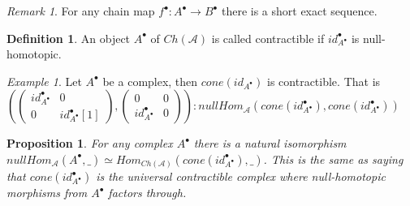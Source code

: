 \documentclass[11pt]{article}
\newtheorem{prop}[theorem]{Proposition}
\theoremstyle{definition}
\newtheorem{definition}{Definition}[section]
\theoremstyle{remark}
\newtheorem*{remark}{Remark}
\newtheorem*{example}{Example}
\newcommand{\chain}[1]{#1^{\bullet}}
\begin{document}
            \begin{remark}
                For any chain map $\chain{f}:\chain{A}\rightarrow\chain{B}$ there is a short exact sequence.
                \begin{center}
                \end{center}
            \end{remark}

            \begin{definition}
                An object $\chain{A}$ of $Ch(\mathcal{A})$ is called contractible if $\chain{id_{\chain{A}}}$ is null-homotopic.
            \end{definition}

            \begin{example}
                Let $\chain{A}$ be a complex, then $cone(id_{\chain{A}})$ is contractible. That is \\$(\begin{pmatrix} \chain{id_{\chain{A}}} & 0 \\ 0 & \chain{id_{\chain{A}}}[1]\end{pmatrix},\begin{pmatrix} 0 & 0 \\ \chain{id_{\chain{A}}} & 0 \end{pmatrix}):nullHom_{\mathcal{A}}(cone(\chain{id_{\chain{A}}}), cone(\chain{id_{\chain{A}}}))$
            \end{example}

            \begin{prop}
                For any complex $\chain{A}$ there is a natural isomorphism $nullHom_{\mathcal{A}}(\chain{A},\_)\simeq Hom_{Ch(\mathcal{A})}(cone(\chain{id_{\chain{A}}}),\_)$. This is the same as saying that $cone(\chain{id_{\chain{A}}})$ is the universal contractible complex where null-homotopic morphisms from $\chain{A}$ factors through.
            \end{prop}
\end{document}
